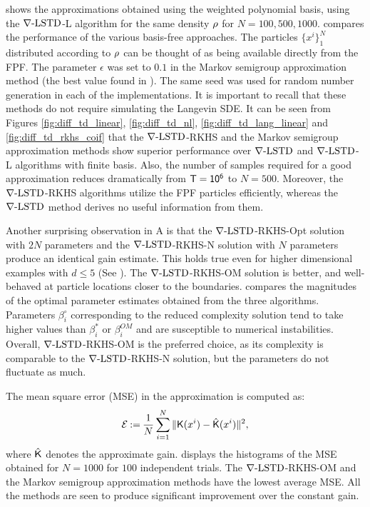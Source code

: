  shows the approximations obtained using the weighted polynomial basis, using the $\nabla\text{-LSTD}$-L algorithm for the same density $\rho$ for $N = 100,500,1000$.
 compares the performance of the various basis-free approaches. The particles $\{x^i\}_1^N$ distributed according to $\rho$ can be thought of as being available directly from the FPF. The parameter $\epsilon$ was set to $0.1$ in the Markov semigroup approximation method (the best value found in \cite{tagmeh16a}). The same seed was used for random number generation in each of the implementations. It is important to recall that these methods do not require simulating the Langevin SDE. It can be seen from Figures \ref{fig:diff_td_linear}, \ref{fig:diff_td_nl}, \ref{fig:diff_td_lang_linear} and \ref{fig:diff_td_rkhs_coif} that the $\nabla\text{-LSTD}$-RKHS and the Markov semigroup approximation methods show superior performance over $\nabla\text{-LSTD}$ and $\nabla\text{-LSTD}$-L algorithms with finite basis. Also, the number of samples required for a good approximation reduces dramatically from $\sf T=10^6$ to $N=500$. Moreover, the $\nabla\text{-LSTD}$-RKHS algorithms utilize the FPF particles efficiently, whereas the $\nabla\text{-LSTD}$ method derives no useful information from them.   

Another surprising observation in  A is that the $\nabla\text{-LSTD}$-RKHS-Opt solution with $2N$ parameters and the $\nabla\text{-LSTD}$-RKHS-N solution with $N$ parameters produce an identical gain estimate. This holds true even for higher dimensional examples with $d\leq 5$ (See ). The $\nabla\text{-LSTD}$-RKHS-OM solution is better, and well-behaved at particle locations closer to the boundaries.  compares the magnitudes of the optimal parameter estimates obtained from the three algorithms. Parameters $\beta_i^\circ$ corresponding to the reduced complexity solution tend to take higher values than $\beta_i^*$ or $\beta_i^{OM}$ and are susceptible to numerical instabilities. Overall, $\nabla\text{-LSTD}$-RKHS-OM is the preferred choice, as its complexity is comparable to the $\nabla\text{-LSTD}$-RKHS-N solution, but the parameters do not fluctuate as much. 

The mean square error (MSE) in the approximation is computed as:
\begin{equation}
\mathcal{E} \eqdef \frac{1}{N} \sum_{i=1}^N \|\kFPF(x^i)  - \hat{\kFPF}(x^i) \|^2,
\label{e:gain_mse}
\end{equation}
where $\hat{\text{\sf K}}$ denotes the approximate gain.  displays the histograms of the MSE obtained for $N=1000$ for $100$ independent trials. The $\nabla\text{-LSTD}$-RKHS-OM and the Markov semigroup approximation methods have the lowest average MSE. All the methods are seen to produce significant improvement over the constant gain. 

